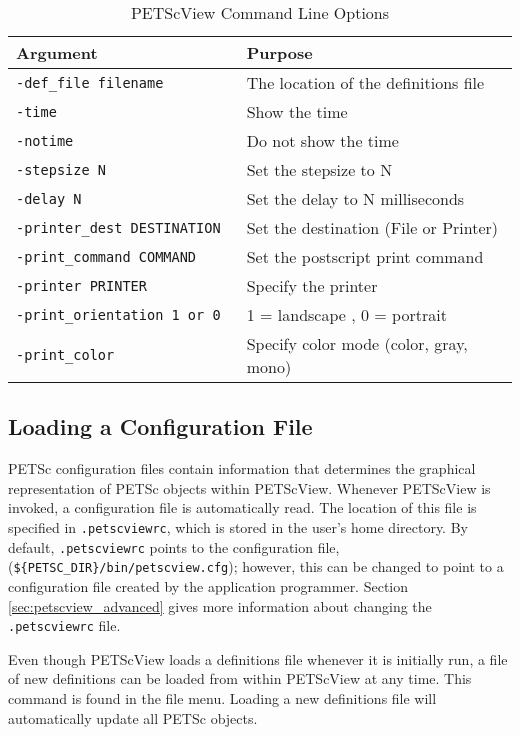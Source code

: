 {\begin{table}
\begin{center}
\begin{tabular}{ll}
{\bf Argument}                  & {\bf Purpose} \\
\hline
{\tt -def\_file filename}       & The location of the definitions file \\
{\tt -time}                    & Show the time \\
{\tt -notime}                  & Do not show the time \\
{\tt -stepsize N}              & Set the stepsize to N \\
{\tt -delay N}                 & Set the delay to N milliseconds \\
{\tt -printer\_dest DESTINATION}& Set the destination (File or Printer) \\
{\tt -print\_command COMMAND}   & Set the postscript print command \\
{\tt -printer PRINTER}         & Specify the printer \\
{\tt -print\_orientation 1 or 0} $\:\:\:$ & 1 = landscape , 0 = portrait \\
{\tt -print\_color}             & Specify color mode (color, gray, mono) \\
\hline
\end{tabular}
\end{center}
\caption{PETScView Command Line Options}
\label{PETScView_command_line_options}
\end{table}

\subsection{Loading a Configuration File}

PETSc configuration files contain information that
determines the graphical representation of PETSc objects within PETScView.
Whenever PETScView is invoked, a configuration file
is automatically read.  The location of this file is specified in
{\tt .petscviewrc}, which is stored in the user's home directory.  By
default, {\tt .petscviewrc} points to the configuration file,
({\tt \$\{PETSC\_DIR\}/bin/petscview.cfg}); however, this can be
changed to point to a configuration file created by the application
programmer.  Section \ref{sec:petscview_advanced} gives
more information about changing the {\tt .petscviewrc} file.

Even though PETScView loads a definitions file whenever it is
initially run, a file of new definitions can be loaded from within
PETScView at any time.  This command is found in the file menu.
Loading a new definitions file will automatically update all PETSc
objects.

}

